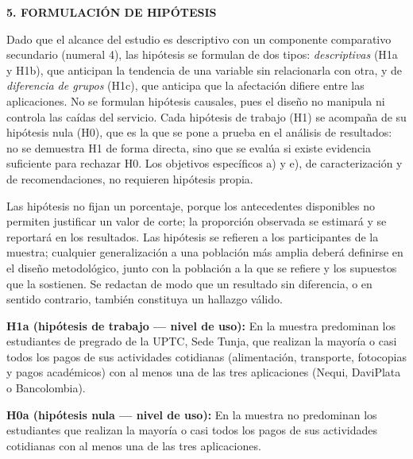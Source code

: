 \hypertarget{sec:hipotesis}{}%
\begin{center}
    {\Large\bfseries 5. FORMULACIÓN DE HIPÓTESIS}
\end{center}
\vspace{1em}

\noindent Dado que el alcance del estudio es descriptivo con un componente comparativo secundario (numeral 4), las hipótesis se formulan de dos tipos: \textit{descriptivas} (H1a y H1b), que anticipan la tendencia de una variable sin relacionarla con otra, y de \textit{diferencia de grupos} (H1c), que anticipa que la afectación difiere entre las aplicaciones. No se formulan hipótesis causales, pues el diseño no manipula ni controla las caídas del servicio. Cada hipótesis de trabajo (H1) se acompaña de su hipótesis nula (H0), que es la que se pone a prueba en el análisis de resultados: no se demuestra H1 de forma directa, sino que se evalúa si existe evidencia suficiente para rechazar H0. Los objetivos específicos a) y e), de caracterización y de recomendaciones, no requieren hipótesis propia.
\par\vspace{1.2em}

\noindent Las hipótesis no fijan un porcentaje, porque los antecedentes disponibles no permiten justificar un valor de corte; la proporción observada se estimará y se reportará en los resultados. Las hipótesis se refieren a los participantes de la muestra; cualquier generalización a una población más amplia deberá definirse en el diseño metodológico, junto con la población a la que se refiere y los supuestos que la sostienen. Se redactan de modo que un resultado sin diferencia, o en sentido contrario, también constituya un hallazgo válido.
\par\vspace{1.2em}

\noindent\textbf{H1a (hipótesis de trabajo --- nivel de uso):} En la muestra predominan los estudiantes de pregrado de la UPTC, Sede Tunja, que realizan la mayoría o casi todos los pagos de sus actividades cotidianas (alimentación, transporte, fotocopias y pagos académicos) con al menos una de las tres aplicaciones (Nequi, DaviPlata o Bancolombia).
\par\vspace{0.8em}

\noindent\textbf{H0a (hipótesis nula --- nivel de uso):} En la muestra no predominan los estudiantes que realizan la mayoría o casi todos los pagos de sus actividades cotidianas con al menos una de las tres aplicaciones.
\par\vspace{1.2em}

